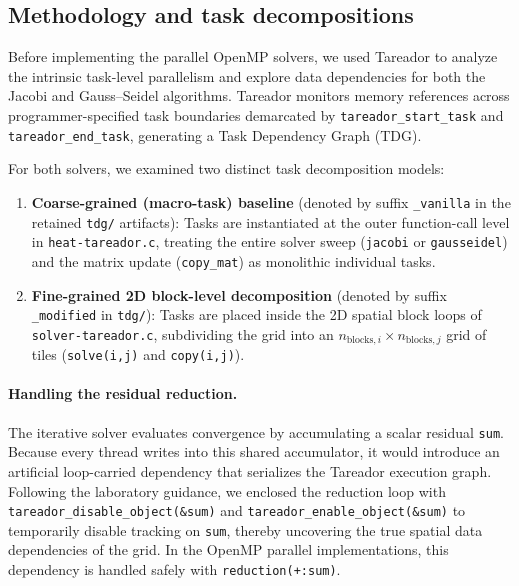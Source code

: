 \documentclass[11pt,a4paper]{article}
\begin{document}
\subsection{Methodology and task decompositions}

Before implementing the parallel OpenMP solvers, we used Tareador to
analyze the intrinsic task-level parallelism and explore data dependencies
for both the Jacobi and Gauss--Seidel algorithms.
Tareador monitors memory references across programmer-specified task
boundaries demarcated by \texttt{tareador\_start\_task} and
\texttt{tareador\_end\_task}, generating a Task Dependency Graph (TDG).

For both solvers, we examined two distinct task decomposition models:
\begin{enumerate}[label=(\roman*)]
  \item \textbf{Coarse-grained (macro-task) baseline} (denoted by suffix
  \texttt{\_vanilla} in the retained \texttt{tdg/} artifacts): Tasks are
  instantiated at the outer function-call level in \texttt{heat-tareador.c},
  treating the entire solver sweep (\texttt{jacobi} or \texttt{gausseidel})
  and the matrix update (\texttt{copy\_mat}) as monolithic individual tasks.
  \item \textbf{Fine-grained 2D block-level decomposition} (denoted by suffix
  \texttt{\_modified} in \texttt{tdg/}): Tasks are placed inside the 2D
  spatial block loops of \texttt{solver-tareador.c}, subdividing the grid into
  an $n_{\mathrm{blocks},i} \times n_{\mathrm{blocks},j}$ grid of tiles
  (\texttt{solve(i,j)} and \texttt{copy(i,j)}).
\end{enumerate}

\paragraph{Handling the residual reduction.}
The iterative solver evaluates convergence by accumulating a scalar residual
\texttt{sum}. Because every thread writes into this shared accumulator,
it would introduce an artificial loop-carried dependency that serializes the
Tareador execution graph. Following the laboratory guidance, we enclosed
the reduction loop with \texttt{tareador\_disable\_object(\&sum)} and
\texttt{tareador\_enable\_object(\&sum)} to temporarily disable tracking on
\texttt{sum}, thereby uncovering the true spatial data dependencies of the
grid. In the OpenMP parallel implementations, this dependency is handled
safely with \texttt{reduction(+:sum)}.
\end{document}
